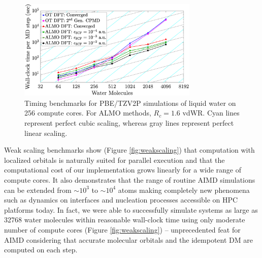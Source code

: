 \documentclass[aps,prl,reprint,amsmath,amssymb]{revtex4-1}
\begin{document}
\begin{figure}
\includegraphics[trim={2.5cm 0.5cm 3.4cm 0.1cm},clip,width=8.6cm]{strongscaling_log.eps}
\caption{\label{fig:strongscaling_log} Timing benchmarks for PBE/TZV2P simulations of liquid water on 256 compute cores. 
For ALMO methods, $R_{c} = 1.6$ vdWR. 
Cyan lines represent perfect cubic scaling, whereas gray lines represent perfect linear scaling. 
}
\end{figure}

Weak scaling benchmarks show (Figure \ref{fig:weakscaling}) that computation with localized orbitals is naturally suited for parallel execution and that the computational cost of our implementation grows linearly for a wide range of compute cores. 
It also demonstrates that the range of routine AIMD simulations can be extended from $\sim 10^3$ to $\sim 10^4$ atoms making completely new phenomena such as dynamics on interfaces and nucleation processes accessible on HPC platforms today. 
In fact, we were able to successfully simulate systems as large as 32768 water molecules within reasonable wall-clock time using only moderate number of compute cores (Figure \ref{fig:weakscaling}) -- unprecedented feat for AIMD considering that accurate molecular orbitals and the idempotent DM are computed on each step.
\end{document}
